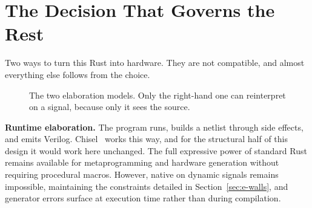 \section{The Decision That Governs the Rest}
\label{sec:e-elaboration}

Two ways to turn this Rust into hardware. They are not compatible, and
almost everything else follows from the choice.

\begin{figure}[H]
\centering
{}
\caption{The two elaboration models. Only the right-hand one can
reinterpret  on a signal, because only it sees the source.}
\label{fig:elaboration}
\end{figure}

\textbf{Runtime elaboration.} The program runs, builds a netlist through
side effects, and emits Verilog. Chisel~\cite{bachrach2012} works this way,
and for the structural half of this design it would work here unchanged.
The full expressive power of standard Rust remains available for metaprogramming
and hardware generation without requiring procedural macros. However, native
 on dynamic signals remains impossible, maintaining the constraints
detailed in Section~\ref{sec:e-walls}, and generator errors surface at execution
time rather than during compilation.

